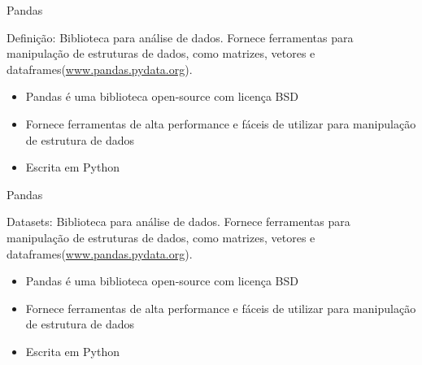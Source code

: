 \begin{frame}[t, fragile]{Pandas}
  \begin{block}{Definição:}
    Biblioteca para análise de dados. Fornece ferramentas para manipulação de estruturas de dados, como matrizes, vetores e dataframes(\url{www.pandas.pydata.org}). 
  \end{block}
  \begin{itemize}
    \item Pandas é uma biblioteca open-source com licença BSD
    \item Fornece ferramentas de alta performance e fáceis de utilizar para manipulação de estrutura de dados
    \item Escrita em Python
  \end{itemize}
\end{frame}
%
%
\begin{frame}[t, fragile]{Pandas}
  \begin{block}{Datasets:}
    Biblioteca para análise de dados. Fornece ferramentas para manipulação de estruturas de dados, como matrizes, vetores e dataframes(\url{www.pandas.pydata.org}). 
  \end{block}
  \begin{itemize}
    \item Pandas é uma biblioteca open-source com licença BSD
    \item Fornece ferramentas de alta performance e fáceis de utilizar para manipulação de estrutura de dados
    \item Escrita em Python
  \end{itemize}
\end{frame}
%
 
 